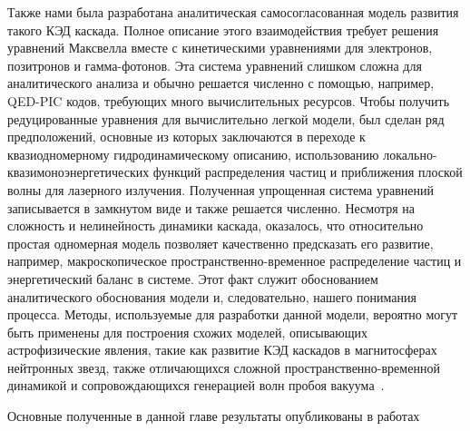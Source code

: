 Также нами была разработана аналитическая самосогласованная модель развития такого КЭД каскада.
Полное описание этого взаимодействия требует решения уравнений Максвелла вместе с кинетическими уравнениями для электронов, позитронов и гамма-фотонов.
Эта система уравнений слишком сложна для аналитического анализа и обычно решается численно с помощью, например, QED-PIC кодов, требующих много вычислительных ресурсов.
Чтобы получить редуцированные уравнения для вычислительно легкой модели, был сделан ряд предположений, основные из которых заключаются в переходе к квазиодномерному гидродинамическому описанию, использованию локально-квазимоноэнергетических функций распределения частиц и приближения плоской волны для лазерного излучения.
Полученная упрощенная система уравнений записывается в замкнутом виде и также решается численно.
Несмотря на сложность и нелинейность динамики каскада, оказалось, что относительно простая одномерная модель позволяет качественно предсказать его развитие, например, макроскопическое пространственно-временное распределение частиц и энергетический баланс в системе.
Этот факт служит обоснованием аналитического обоснования модели и, следовательно, нашего понимания процесса.
Методы, используемые для разработки данной модели, вероятно могут быть применены для построения схожих моделей, описывающих астрофизические явления, такие как развитие КЭД каскадов в магнитосферах нейтронных звезд, также отличающихся сложной пространственно-временной динамикой и сопровождающихся генерацией волн пробоя вакуума~\cite{timokhin2010time}.

Основные полученные в данной главе результаты опубликованы в работах~\cite{samsonov2019laser, samsonov2021hydrodynamical, samsonov2021effect, samsonov2018NW, samsonov2019FNP, samsonov2020NW, samsonov2020UFL, samsonov2021UFL}

\FloatBarrier
